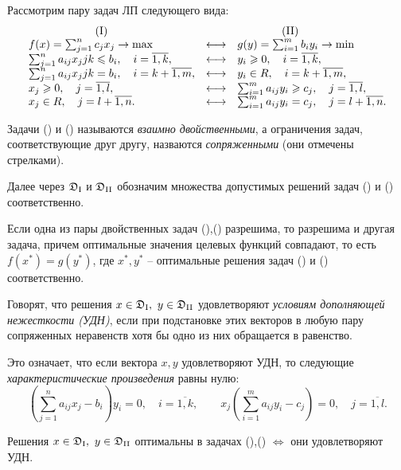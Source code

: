 Рассмотрим пару задач ЛП следующего вида:
\[
    \begin{array}{lcl}
        \qquad \qquad \qquad (\text{\RomanNumeralCaps{1}}) & & \qquad \qquad (\text{\RomanNumeralCaps{2}}) \\
        f(x) = \sum_{j=1}^{n}c_jx_j \rightarrow \max & \longleftrightarrow & g(y) = \sum_{i=1}^{m}b_iy_i \rightarrow \min \\
        \sum_{j=1}^{n}a_{ij}x_jjk \leqslant b_i, \quad i = \overline{1,k}, & \longleftrightarrow & y_i \geqslant 0, \quad i = \overline{1,k}, \\
        \sum_{j=1}^{n}a_{ij}x_jjk = b_i, \quad i = k + \overline{1,m}, & \longleftrightarrow & y_i \in R, \quad i = k + \overline{1,m}, \\
    x_j \geqslant 0, \quad j = \overline{1,l}, & \longleftrightarrow & \sum_{i=1}^{m}a_{ij}y_i \geqslant c_j, \quad j = \overline{1,l}, \\
        x_j \in R, \quad j = l + \overline{1,n}. & \longleftrightarrow & \sum_{i=1}^{m}a_{ij}y_i = c_j, \quad j = l + \overline{1,n}.
    \end{array}    
\]

\begin{definition}
  Задачи () и () называются \emph{взаимно двойственными}, а ограничения задач, соответствующие друг другу, назваются \emph{сопряженными} (они отмечены стрелками).

    Далее через $ \mathfrak{D}_\text{\RomanNumeralCaps{1}} $ и $ \mathfrak{D}_\text{\RomanNumeralCaps{2}} $ обозначим множества допустимых решений задач () и () соответственно.
\end{definition}

\begin{theorem}
  Если одна из пары двойственных задач (),() разрешима, то разрешима и другая задача, причем оптимальные значения целевых функций совпадают, то есть $ f(x^{*}) = g(y^*) $, где $ x^*,y^* $ -- оптимальные решения задач () и () соответственно.
\end{theorem}

\begin{definition}
  Говорят, что решения $ x \in \mathfrak{D}_\text{\RomanNumeralCaps{1}}, \ y \in \mathfrak{D}_\text{\RomanNumeralCaps{2}} $ удовлетворяют \emph{условиям дополняющей нежесткости (УДН)}, если при подстановке этих векторов в любую пару сопряженных неравенств хотя бы одно из них обращается в равенство.

    Это означает, что если вектора $ x,y $ удовлетворяют УДН, то следующие \emph{характеристические произведения} равны нулю:
    \[
        \left(\sum_{j=1}^{n}a_{ij}x_j - b_i\right)y_i = 0, \quad i = \overline{1,k}, \qquad x_j \left(\sum_{i=1}^{m}a_{ij}y_i - c_j\right) = 0, \quad j = \overline{1,l}.  
    \]
\end{definition}

\begin{theorem}
  Решения $ x \in \mathfrak{D}_\text{\RomanNumeralCaps{1}}, \ y \in \mathfrak{D}_\text{\RomanNumeralCaps{2}} $ оптимальны в задачах (),() $ \iff $ они удовлетворяют УДН.
\end{theorem}
